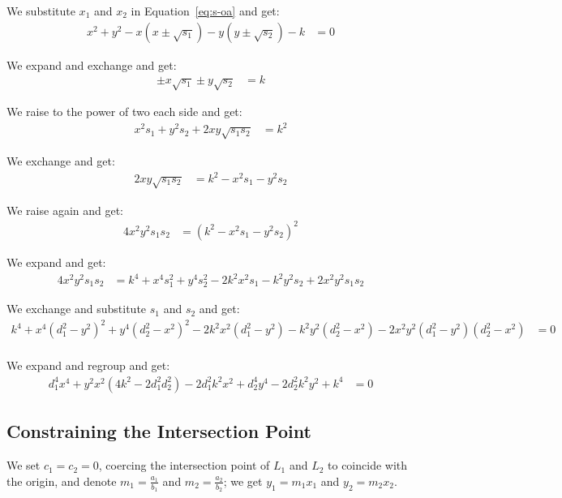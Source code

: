 \noindent
We substitute $x_1$ and $x_2$ in Equation~\ref{eq:s-oa} and get:
\begin{align*}
  x^2 + y^2 - x (x \pm \sqrt{s_1}) - y (y \pm \sqrt{s_2}) - k &= 0
\end{align*}

\noindent
We expand and exchange and get:
\begin{align*}
  \pm x \sqrt{s_1} \pm y \sqrt{s_2} &= k
\end{align*}

\noindent
We raise to the power of two each side and get:
\begin{align*}
  x^2 s_1 + y^2 s_2 + 2 x y \sqrt{s_1 s_2} &= k^2
\end{align*}

\noindent
We exchange and get:
\begin{align*}
  2 x y \sqrt{s_1 s_2} &= k^2 - x^2 s_1 - y^2 s_2
\end{align*}

\noindent
We raise again and get:
\begin{align*}
  4 x^2 y^2 s_1 s_2 &= (k^2 - x^2 s_1 - y^2 s_2)^2
\end{align*}

\noindent
We expand and get:
\begin{align*}
  4 x^2 y^2 s_1 s_2 &= k^4 + x^4 s_1^2 + y^4 s_2^2 - 2 k^2 x^2 s_1 - k^2 y^2 s_2 + 2 x^2 y^2 s_1 s_2
\end{align*}

\noindent
We exchange and substitute $s_1$ and $s_2$ and get:
\begin{align*}
  k^4 + x^4 (d_1^2 - y^2)^2 + y^4 (d_2^2 - x^2)^2 - 2 k^2 x^2 (d_1^2 - y^2) - k^2 y^2 (d_2^2 - x^2) - 2 x^2 y^2 (d_1^2 - y^2) (d_2^2 - x^2) &= 0\\
\end{align*}

\noindent
We expand and regroup and get:
\begin{align}
  d_1^4 x^4 + y^2 x^2 (4 k^2 - 2 d_1^2 d_2^2) - 2 d_1^2 k^2 x^2 + d_2^4 y^4 - 2 d_2^2 k^2 y^2 + k^4 &= 0
\end{align}

\subsection{Constraining the Intersection Point}
\label{ssec:derivation-constraining-origin}
\setlength{\parskip}{1ex}
We set $c_1 = c_2 = 0$, coercing the intersection point of $L_1$ and $L_2$ to coincide with the origin, and denote $m_1 = \frac{a_1}{b_1}$ and $m_2 = \frac{a_2}{b_2}$; we get $y_1 = m_1 x_1$ and $y_2 = m_2 x_2$.

